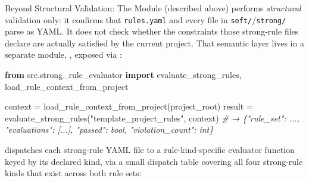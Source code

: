 \documentclass[
  ignorenonframetext,
]{beamer}
\newenvironment{Shaded}{}{}
\newcommand{\CommentTok}[1]{\textcolor[rgb]{0.38,0.63,0.69}{\textit{#1}}}
\newcommand{\ImportTok}[1]{\textcolor[rgb]{0.00,0.50,0.00}{\textbf{#1}}}
\newcommand{\NormalTok}[1]{#1}
\newcommand{\OperatorTok}[1]{\textcolor[rgb]{0.40,0.40,0.40}{#1}}
\newcommand{\StringTok}[1]{\textcolor[rgb]{0.25,0.44,0.63}{#1}}
\begin{document}
\begin{frame}{Beyond Structural Validation:
The  Module}
\protect{}\label{beyond-structural-validation-the-strong_rule_evaluator-module}
 (described above) performs
\emph{structural} validation only: it confirms that \texttt{rules.yaml}
and every file in \texttt{soft/}/\texttt{strong/} parse as YAML. It does
not check whether the constraints those strong-rule files declare are
actually satisfied by the current project. That semantic layer lives in
a separate module, , exposed via
:

\begin{Shaded}
\begin{Highlighting}[]
\ImportTok{from}\NormalTok{ src.strong\_rule\_evaluator }\ImportTok{import}\NormalTok{ evaluate\_strong\_rules, load\_rule\_context\_from\_project}

\NormalTok{context }\OperatorTok{=}\NormalTok{ load\_rule\_context\_from\_project(project\_root)}
\NormalTok{result }\OperatorTok{=}\NormalTok{ evaluate\_strong\_rules(}\StringTok{"template\_project\_rules"}\NormalTok{, context)}
\CommentTok{\# → \{"rule\_set": ..., "evaluations": [...], "passed": bool, "violation\_count": int\}}
\end{Highlighting}
\end{Shaded}

 dispatches each strong-rule YAML file
to a rule-kind-specific evaluator function keyed by its declared kind,
via a small dispatch table covering all four strong-rule kinds that
exist across both rule sets:


\end{frame}
\end{document}
